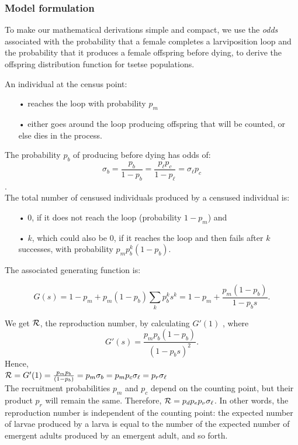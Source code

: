 \documentclass[smallextended]{svjour3}
\begin{document}
	\subsubsection{Model formulation}
	To make our mathematical derivations simple and compact, we use the \textit{odds} associated with the probability that a female completes a larviposition loop and the probability  that it produces a female offspring before dying, to derive the offspring distribution function for tsetse populations.  
	
	An individual at the census point: 
	
	\begin{itemize}
		\item [•] reaches the loop with probability $p_m$
		\item [•] either goes around the loop producing offspring that will be counted, or else dies in the process.
	\end{itemize}
	
	The probability $p_b$ of producing before dying  has odds of: 
	$$\sigma_b = \frac{p_b}{1-p_b} = \frac{p_\ell p_c}{1-p_\ell} = \sigma_\ell p_c$$.\\
	
	The total number of censused individuals produced by a censused individual is: 
	
	\begin{itemize}
		\item [•] 0, if it does not reach the loop (probability $1-p_m$) and
		\item [•] $k$, which could also be 0, if it reaches the loop and then fails after $k$ successes, with probability $p_m p_b^k (1-p_b)$.\\
	\end{itemize}  
	
	The associated generating function  is:
	
	$$G(s) = 1-p_m + p_m (1-p_b) \sum_k p_b^k s^k = 1-p_m + \frac{p_m (1-p_b)}{1-p_b s}.$$
	
	We get ${\cal R}$, the reproduction number, by calculating $G'(1)$ \cite{bartlett1949some}, where $$G'(s) = \frac{p_m p_b (1-p_b)}{(1-p_b s)^2}.$$  Hence, \\
	
	$ {\cal R}= G'(1) = \frac{p_m p_b}{(1-p_b)} = p_m \sigma_b = p_mp_c \sigma_\ell =  p_r\sigma_\ell$ \\
	
	The recruitment probabilities $p_m$ and $p_c$ depend on the counting point, but their product $p_r$ will remain the same. Therefore, ${\cal R} =p_dp_ep_{\nu} \sigma_{\ell}$. In other words, the reproduction number is independent of the counting point: the expected number of larvae produced by a larva is equal to the number of the expected number of emergent adults produced by an emergent adult, and so forth.
	
\end{document}
